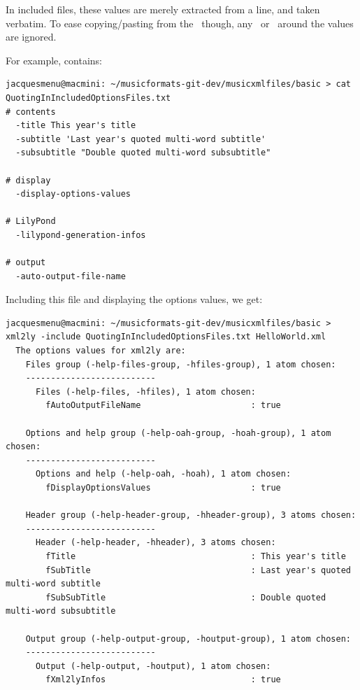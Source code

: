 In included files, these values are merely extracted from a line, and taken verbatim. To ease copying/pasting from the \CLI\, though, any \quotes\ or \doubleQuotes\ around the values are ignored.

For example,  contains:
\begin{lstlisting}[language=Terminal]
jacquesmenu@macmini: ~/musicformats-git-dev/musicxmlfiles/basic > cat QuotingInIncludedOptionsFiles.txt
# contents
  -title This year's title
  -subtitle 'Last year's quoted multi-word subtitle'
  -subsubtitle "Double quoted multi-word subsubtitle"

# display
  -display-options-values

# LilyPond
  -lilypond-generation-infos

# output
  -auto-output-file-name
\end{lstlisting}

Including this file and displaying the options values, we get:
\begin{lstlisting}[language=Terminal]
jacquesmenu@macmini: ~/musicformats-git-dev/musicxmlfiles/basic > xml2ly -include QuotingInIncludedOptionsFiles.txt HelloWorld.xml
  The options values for xml2ly are:
    Files group (-help-files-group, -hfiles-group), 1 atom chosen:
    --------------------------
      Files (-help-files, -hfiles), 1 atom chosen:
        fAutoOutputFileName                      : true

    Options and help group (-help-oah-group, -hoah-group), 1 atom chosen:
    --------------------------
      Options and help (-help-oah, -hoah), 1 atom chosen:
        fDisplayOptionsValues                    : true

    Header group (-help-header-group, -hheader-group), 3 atoms chosen:
    --------------------------
      Header (-help-header, -hheader), 3 atoms chosen:
        fTitle                                   : This year's title
        fSubTitle                                : Last year's quoted multi-word subtitle
        fSubSubTitle                             : Double quoted multi-word subsubtitle

    Output group (-help-output-group, -houtput-group), 1 atom chosen:
    --------------------------
      Output (-help-output, -houtput), 1 atom chosen:
        fXml2lyInfos                             : true
\end{lstlisting}


